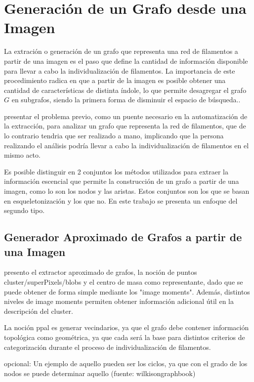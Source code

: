 \section{Generaci\'on de un Grafo desde una Imagen}
La extraci\'on o generaci\'on de un grafo que representa una red de filamentos a partir de una imagen es el paso que define la cantidad de informaci\'on disponible para llevar a cabo la individualizaci\'on de filamentos. La importancia de este procedimiento radica en que a partir de la imagen es posible obtener una cantidad de caracter\'isticas de distinta \'indole, lo que permite desagregar el grafo $G$ en subgrafos, siendo la primera forma de disminuir el espacio de b\'usqueda.. 


presentar el problema previo, como un puente necesario en la 
automatizaci\'on de la extracci\'on,  para analizar un grafo que representa la red de filamentos, que de lo contrario tendria que ser realizado a mano, implicando que la persona realizando el análisis podría llevar a cabo la individualizaci\'on de filamentos en el mismo acto.

Es posible distinguir en 2 conjuntos los m\'etodos utilizados para extraer la informaci\'on escencial que permite la construcci\'on de un grafo a partir de una imagen, como lo son los nodos y las aristas. Estos conjuntos son los que se basan en esqueletonizaci\'on\cite{lavado2018comparacion} y los que no. En este trabajo se presenta un enfoque del segundo tipo.

\subsection{Generador Aproximado de Grafos a partir de una Imagen}
presento el extractor aproximado de grafos, la noción de puntos cluster/superPixels/blobs y el centro de masa como representante, dado que se puede obtener de forma simple mediante los "image moments". Además, distintos niveles de image moments permiten obtener información adicional útil en la descripción del cluster.

La noción ppal es generar vecindarios, ya que el grafo debe contener información topológica como geométrica, ya que cada será la base para distintos criterios de categorización durante el proceso de individualización de filamentos. 

opcional: Un ejemplo de aquello pueden ser los ciclos, ya que con el grado de los nodos se puede determinar aquello (fuente: wilkisongraphbook)

